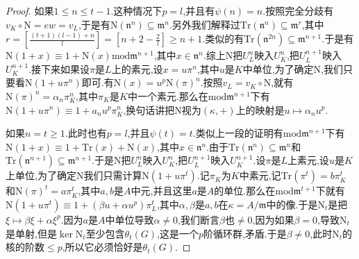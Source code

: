 \begin{enumerate}
\begin{proof}
		\qquad
		
		如果$1\le n\le t-1$.这种情况下$p=l$,并且有$\psi(n)=n$.按照完全分歧有$v_K\circ\mathrm{N}=ew=v_L$,于是有$\mathrm{N}(\mathfrak{n}^n)\subseteq\mathfrak{m}^n$.另外我们解释过$\mathrm{Tr}(\mathfrak{n}^n)\subseteq\mathfrak{m}^r$,其中$r=\left[\frac{(t+1)(l-1)+n}{l}\right]=\left[n+2-\frac{2}{l}\right]\ge n+1$.类似的有$\mathrm{Tr}(\mathfrak{n}^{2n})\subseteq\mathfrak{m}^{n+1}$.于是有$\mathrm{N}(1+x)\equiv1+\mathrm{N}(x)\mathrm{mod}\mathfrak{m}^{n+1}$,其中$x\in\mathfrak{n}^n$.综上$\mathrm{N}$把$U_L^n$映入$U_K^n$,把$U_L^{n+1}$映入$U_K^{n+1}$.接下来如果设$\pi$是$L$上的素元,设$x=u\pi^n$,其中$u$是$K$中单位,为了确定$\mathrm{N}$,我们只要看$\mathrm{N}(1+u\pi^n)$即可.有$\mathrm{N}(x)=u^p\mathrm{N}(\pi)^n$.按照$v_L=v_K\circ\mathrm{N}$,就有$\mathrm{N}(\pi)^n=\alpha_n\pi_K^n$,其中$\pi_K$是$K$中一个素元.那么在$\mathrm{mod}\mathfrak{m}^{n+1}$下有$\mathrm{N}(1+u\pi^n)\equiv1+a_nu^p\pi_K^n$,换句话讲把$\mathrm{N}$视为$(\kappa,+)$上的映射是$u\mapsto\alpha_nu^p$.
		
		\qquad
		
		如果$n=t\ge1$.此时也有$p=l$,并且$\psi(t)=t$.类似上一段的证明有$\mathrm{mod}\mathfrak{m}^{n+1}$下有$\mathrm{N}(1+x)\equiv1+\mathrm{Tr}(x)+\mathrm{N}(x)$,其中$x\in\mathfrak{n}^n$.由于$\mathrm{Tr}(\mathfrak{n}^n)\subseteq\mathfrak{m}^n$和$\mathrm{Tr}(\mathfrak{n}^{n+1})\subseteq\mathfrak{m}^{n+1}$.于是$\mathrm{N}$把$U_L^n$映入$U_K^n$,把$U_L^{n+1}$映入$U_K^{n+1}$.设$\pi$是$L$上素元,设$u$是$K$上单位,为了确定$\mathrm{N}$我们只需计算$\mathrm{N}(1+u\pi^t)$.记$\pi_K$为$K$中素元,记$\mathrm{Tr}(\pi^t)=b\pi_K^t$和$\mathrm{N}(\pi)^t=a\pi_K^t$,其中$a,b$是$A$中元,并且这里$a$是$A$的单位.那么在$\mathrm{mod}\mathfrak{m}^{t+1}$下就有$\mathrm{N}(1+u\pi^t)\equiv1+(\beta u+\alpha u^p)\pi_L^t$,其中$\alpha,\beta$是$a,b$在$\kappa=A/\mathfrak{m}$中的像.于是$\mathrm{N}_t$是把$\xi\mapsto\beta\xi+\alpha\xi^p$.因为$a$是$A$中单位导致$\alpha\not=0$,我们断言$\beta$也$\not=0$,因为如果$\beta=0$,导致$\mathrm{N}_t$是单射,但是$\ker\mathrm{N}_t$至少包含$\theta_t(G)$,这是一个$p$阶循环群,矛盾.于是$\beta\not=0$,此时$\mathrm{N}_t$的核的阶数$\le p$,所以它必须恰好是$\theta_t(G)$.
		
		\qquad
		

\end{proof}
\end{enumerate}
